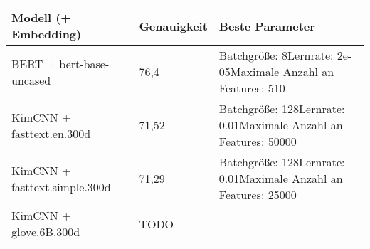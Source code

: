 \documentclass[11pt]{article}
\begin{document}
\begin{longtable}[]{@{}lll@{}}
\toprule
\begin{minipage}[b]{0.14\columnwidth}\raggedright
Modell (+ Embedding)\strut
\end{minipage} & \begin{minipage}[b]{0.07\columnwidth}\raggedright
Genauigkeit\strut
\end{minipage} & \begin{minipage}[b]{0.70\columnwidth}\raggedright
Beste Parameter\strut
\end{minipage}\tabularnewline
\midrule
\endhead
\begin{minipage}[t]{0.14\columnwidth}\raggedright
BERT + bert-base-uncased\strut
\end{minipage} & \begin{minipage}[t]{0.07\columnwidth}\raggedright
76,4\strut
\end{minipage} & \begin{minipage}[t]{0.70\columnwidth}\raggedright
Batchgröße: 8Lernrate: 2e-05Maximale Anzahl an Features: 510\strut
\end{minipage}\tabularnewline
\begin{minipage}[t]{0.14\columnwidth}\raggedright
KimCNN + fasttext.en.300d\strut
\end{minipage} & \begin{minipage}[t]{0.07\columnwidth}\raggedright
71,52\strut
\end{minipage} & \begin{minipage}[t]{0.70\columnwidth}\raggedright
Batchgröße: 128Lernrate: 0.01Maximale Anzahl an Features: 50000\strut
\end{minipage}\tabularnewline
\begin{minipage}[t]{0.14\columnwidth}\raggedright
KimCNN + fasttext.simple.300d\strut
\end{minipage} & \begin{minipage}[t]{0.07\columnwidth}\raggedright
71,29\strut
\end{minipage} & \begin{minipage}[t]{0.70\columnwidth}\raggedright
Batchgröße: 128Lernrate: 0.01Maximale Anzahl an Features: 25000\strut
\end{minipage}\tabularnewline
\begin{minipage}[t]{0.14\columnwidth}\raggedright
KimCNN + glove.6B.300d\strut
\end{minipage} & \begin{minipage}[t]{0.07\columnwidth}\raggedright
TODO\strut
\end{minipage} & \begin{minipage}[t]{0.70\columnwidth}\raggedright

\end{minipage}
\end{longtable}
\end{document}
